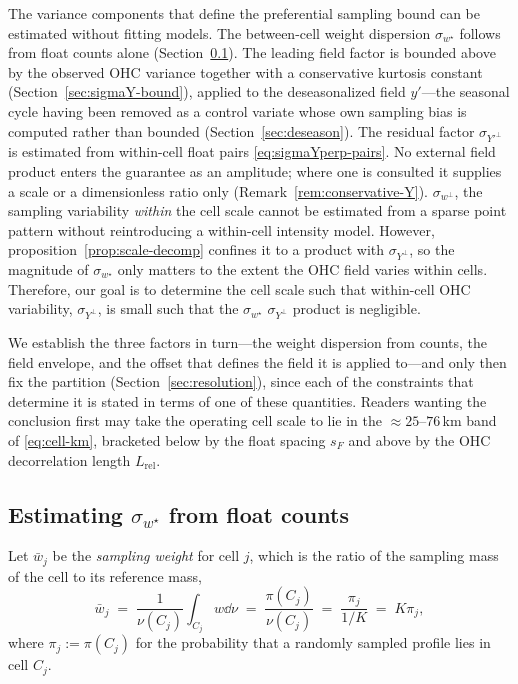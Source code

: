 The variance components that define the preferential sampling bound can be estimated without fitting models.
The between-cell weight dispersion $\sigma_{w^{\star}}$ follows from
float counts alone (Section~\ref{sec:sigmawK}). The leading field factor
is bounded above by the observed OHC variance together with a
conservative kurtosis constant (Section~\ref{sec:sigmaY-bound}), applied
to the deseasonalized field $y'$---the seasonal cycle having been
removed as a control variate whose own sampling bias is computed rather
than bounded (Section~\ref{sec:deseason}). The residual factor
$\sigma_{Y'^{\perp}}$ is estimated from within-cell float pairs
\eqref{eq:sigmaYperp-pairs}. No external field product enters the
guarantee as an amplitude; where one is consulted it supplies a scale or
a dimensionless ratio only (Remark~\ref{rem:conservative-Y}).
$\sigma_{w^{\perp}}$, the sampling variability \emph{within} the cell scale cannot be estimated from a sparse point pattern without reintroducing a within-cell intensity model.
However, proposition~\ref{prop:scale-decomp} confines it to a product with $\sigma_{Y^{\perp}}$, so the magnitude of $\sigma_{w^{\star}}$ only matters to the extent the OHC field varies within cells.
Therefore, our goal is to determine the cell scale such that within-cell OHC variability, $\sigma_{Y^{\perp}}$, is small such that the $\sigma_{w^{\star}}$ $\sigma_{Y^{\perp}}$ product is negligible.

We establish the three factors in turn---the weight dispersion from
counts, the field envelope, and the offset that defines the field it is
applied to---and only then fix the partition
(Section~\ref{sec:resolution}), since each of the constraints that
determine it is stated in terms of one of these quantities. Readers
wanting the conclusion first may take the operating cell scale to lie in
the ${\approx}25$--$76$\,km band of \eqref{eq:cell-km}, bracketed below
by the float spacing $s_F$ and above by the OHC decorrelation length
$L_{\mathrm{rel}}$.

\subsection{Estimating $\sigma_{w^{\star}}$ from float counts}
\label{sec:sigmawK}

\begin{definition}
\label{def:sweight}
Let $\bar w_j$ be the \emph{sampling weight} for cell $j$, which is the ratio of the sampling mass of the cell to its reference mass,
\begin{equation}
  \bar w_j \;=\; \frac{1}{\nu(C_j)}\int_{C_j}w\dd\nu \;=\; \frac{\pi(C_j)}{\nu(C_j)} \;=\; \frac{\pi_j}{1/K}
  \;=\; K\pi_j ,
  \label{eq:cell-weight}
\end{equation}
where $\pi_j:=\pi(C_j)$ for the probability that a randomly sampled profile lies in cell $C_j$.
\end{definition}

